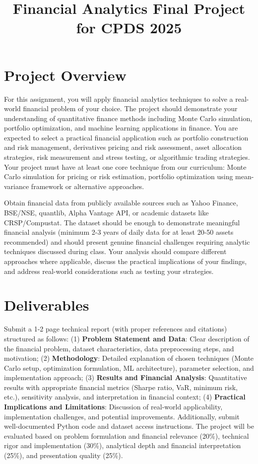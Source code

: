 \documentclass{article}
\title{Financial Analytics Final Project for CPDS 2025}
\date{}
\begin{document}
\maketitle

\section*{Project Overview}

For this assignment, you will apply financial analytics techniques to solve a real-world financial problem of your choice. The project should demonstrate your understanding of quantitative finance methods including Monte Carlo simulation, portfolio optimization, and machine learning applications in finance. You are expected to select a practical financial application such as portfolio construction and risk management, derivatives pricing and risk assessment, asset allocation strategies, risk measurement and stress testing, or algorithmic trading strategies. Your project must have at least one core technique from our curriculum: Monte Carlo simulation for pricing or risk estimation, portfolio optimization using mean-variance framework or alternative approaches.

Obtain financial data from publicly available sources such as Yahoo Finance, BSE/NSE, quantlib, Alpha Vantage API, or academic datasets like CRSP/Compustat. The dataset should be enough to demonstrate meaningful financial analysis (minimum 2-3 years of daily data for at least 20-50 assets recommended) and should present genuine financial challenges requiring analytic techniques discussed during class. Your analysis should compare different approaches where applicable, discuss the practical implications of your findings, and address real-world considerations such as testing your strategies.

\section*{Deliverables}

Submit a 1-2 page technical report (with proper references and citations) structured as follows: (1) \textbf{Problem Statement and Data}: Clear description of the financial problem, dataset characteristics, data preprocessing steps, and motivation; (2) \textbf{Methodology}: Detailed explanation of chosen techniques (Monte Carlo setup, optimization formulation, ML architecture), parameter selection, and implementation approach; (3) \textbf{Results and Financial Analysis}: Quantitative results with appropriate financial metrics (Sharpe ratio, VaR, minimum risk, etc.), sensitivity analysis, and interpretation in financial context; (4) \textbf{Practical Implications and Limitations}: Discussion of real-world applicability, implementation challenges, and potential improvements. Additionally, submit well-documented Python code and dataset access instructions. The project will be evaluated based on problem formulation and financial relevance (20\%), technical rigor and implementation (30\%), analytical depth and financial interpretation (25\%), and presentation quality (25\%).
\end{document}
